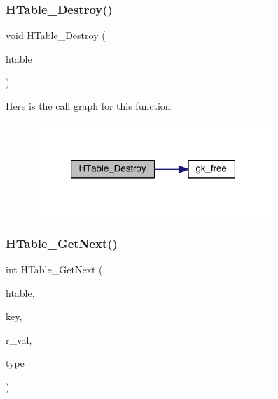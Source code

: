 \subsubsection{\texorpdfstring{H\+Table\+\_\+\+Destroy()}{HTable\_Destroy()}}
{\footnotesize\ttfamily void H\+Table\+\_\+\+Destroy (\begin{DoxyParamCaption}\item[{\hyperlink{a00650}{gk\+\_\+\+H\+Table\+\_\+t} $\ast$}]{htable }\end{DoxyParamCaption})}

Here is the call graph for this function\+:\nopagebreak
\begin{figure}[H]
\begin{center}
\leavevmode
\includegraphics[width=256pt]{a00098_a4552b6bc8e0b509913638222daecf3aa_cgraph}
\end{center}
\end{figure}
\mbox{\label{a00098_a226d34f299950350235ed2f54146c292}} 
\subsubsection{\texorpdfstring{H\+Table\+\_\+\+Get\+Next()}{HTable\_GetNext()}}
{\footnotesize\ttfamily int H\+Table\+\_\+\+Get\+Next (\begin{DoxyParamCaption}\item[{\hyperlink{a00650}{gk\+\_\+\+H\+Table\+\_\+t} $\ast$}]{htable,  }\item[{int}]{key,  }\item[{int $\ast$}]{r\+\_\+val,  }\item[{int}]{type }\end{DoxyParamCaption})}

